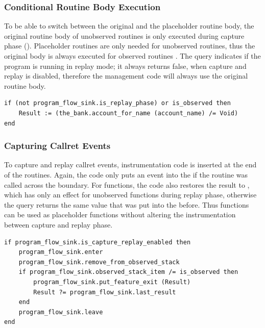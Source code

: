 \subsubsection{Conditional Routine Body Execution}
To be able to switch between the original and the placeholder routine body, the original routine body of unobserved routines is only executed during capture phase (). Placeholder routines are only needed for unobserved routines, thus the original body is always executed for observed routines . The query  indicates if the program is running in replay mode; it always returns false, when capture and replay is disabled, therefore the management code will always use the original routine body.

\begin{lstlisting}[caption=Conditional Methodbody,label=lst:methodbody_instrumentation]
if (not program_flow_sink.is_replay_phase) or is_observed then
	Result := (the_bank.account_for_name (account_name) /= Void)
end
\end{lstlisting}


\subsubsection{Capturing Callret Events}
To capture and replay callret events, instrumentation code is inserted at the end of the routines. Again, the code only puts an event into the  if the routine was called across the boundary. For functions, the code also restores the result to , which has only an effect for unobserved functions during replay phase, otherwise the query  returns the same value that was put into the  before. Thus functions can be used as placeholder functions without altering the instrumentation between capture and replay phase.
\begin{lstlisting}[caption=Instrumentation to Capture Callret Events,label=lst:exit_instrumentation]
if program_flow_sink.is_capture_replay_enabled then
	program_flow_sink.enter
	program_flow_sink.remove_from_observed_stack
	if program_flow_sink.observed_stack_item /= is_observed then
		program_flow_sink.put_feature_exit (Result)
		Result ?= program_flow_sink.last_result
	end
	program_flow_sink.leave
end
\end{lstlisting}


